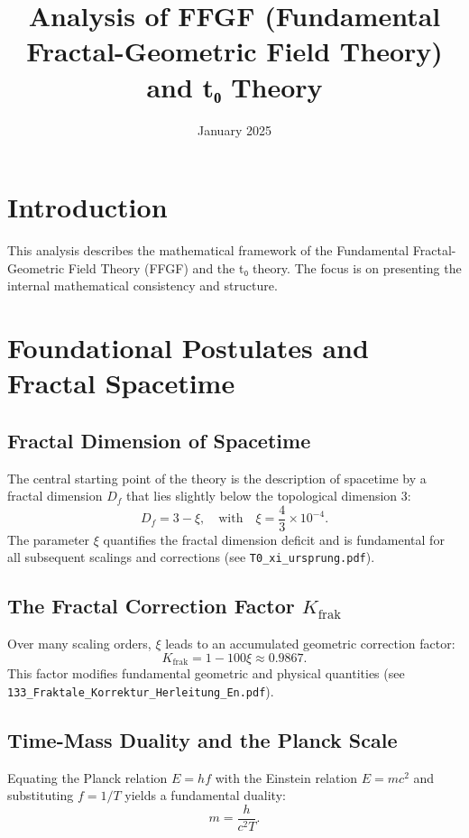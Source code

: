 \documentclass[12pt,a4paper]{article}
\title{Analysis of FFGF (Fundamental Fractal-Geometric Field Theory) and t₀ Theory}
\author{}
\date{January 2025}
\begin{document}
	
	\maketitle
	
	\section{Introduction}
	This analysis describes the mathematical framework of the Fundamental Fractal-Geometric Field Theory (FFGF) and the t₀ theory. The focus is on presenting the internal mathematical consistency and structure.
	
	\section{Foundational Postulates and Fractal Spacetime}
	\subsection{Fractal Dimension of Spacetime}
	The central starting point of the theory is the description of spacetime by a fractal dimension \(D_f\) that lies slightly below the topological dimension 3:
	\begin{equation}
		D_f = 3 - \xi, \quad \text{with} \quad \xi = \frac{4}{3} \times 10^{-4}.
		\label{eq:fractal_dimension}
	\end{equation}
	The parameter \(\xi\) quantifies the fractal dimension deficit and is fundamental for all subsequent scalings and corrections
	(see \texttt{T0\_xi\_ursprung.pdf}).
	
	\subsection{The Fractal Correction Factor \(K_{\text{frak}}\)}
	Over many scaling orders, \(\xi\) leads to an accumulated geometric correction factor:
	\begin{equation}
		K_{\text{frak}} = 1 - 100\xi \approx 0.9867.
		\label{eq:K_frak}
	\end{equation}
	This factor modifies fundamental geometric and physical quantities
	(see \texttt{133\_Fraktale\_Korrektur\_Herleitung\_En.pdf}).
	
	\subsection{Time-Mass Duality and the Planck Scale}
	Equating the Planck relation \(E = hf\) with the Einstein relation \(E = mc^2\) and substituting \(f = 1/T\) yields a fundamental duality:
	\begin{equation}
		m = \frac{h}{c^2 T}.
		\label{eq:time_mass_duality}
	\end{equation}
		\tableofcontents
\end{document}
